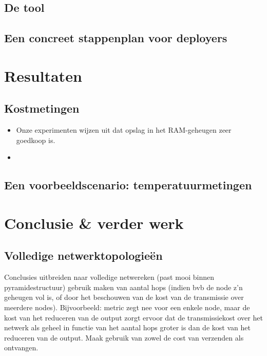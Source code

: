 \documentclass{article}
\begin{document}
\subsection{De tool}

\subsection{Een concreet stappenplan voor deployers}


\section{Resultaten}

\subsection{Kostmetingen}
\begin{itemize}
\item Onze experimenten wijzen uit dat opslag in het RAM-geheugen zeer goedkoop
is.
\item 
\end{itemize}
\subsection{Een voorbeeldscenario: temperatuurmetingen}

\section{Conclusie \& verder werk}

\subsection{Volledige netwerktopologie\"en}

Conclusies uitbreiden naar volledige netwereken (past mooi binnen
pyramidestructuur) gebruik maken van aantal hops (indien bvb de node z’n
geheugen vol is, of door het beschouwen van de kost van de transmissie over
meerdere nodes). Bijvoorbeeld: metric zegt nee voor een enkele node, maar de
kost van het reduceren van de output zorgt ervoor dat de transmissiekost over
het netwerk als geheel in functie van het aantal hops groter is dan de kost van
het reduceren van de output. Maak gebruik van zowel de cost van verzenden als
ontvangen.



\end{document}
